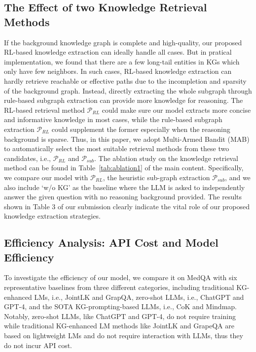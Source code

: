 \documentclass{article}
\theoremstyle{boldremark}
\begin{document}
\subsection{The Effect of two Knowledge Retrieval Methods}
If the background knowledge graph is complete and high-quality, our proposed RL-based knowledge extraction can ideally handle all cases. But in pratical implementation, we found that there are a few long-tail entities in KGs which only have few neighbors. In such cases, RL-based knowledge extraction can hardly retrieve reachable or effective paths due to the incompletion and sparsity of the background graph. Instead, directly extracting the whole subgraph through rule-based subgraph extraction can provide more knowledge for reasoning. The RL-based retrieval method $\mathcal{P}_{RL}$ could make sure our model extracts more concise and informative knowledge in most cases, while the rule-based subgraph extraction $\mathcal{P}_{RL}$ could supplement the former especially when the reasoning background is sparse. Thus, in this paper, we adopt Multi-Armed Bandit (MAB) to automatically select the most suitable retrieval methods from these two candidates, i.e., $\mathcal{P}_{RL}$ and $\mathcal{P}_{sub}$. The ablation study on the knowledge retrieval method can be found in Table~\ref{tab:ablation1} of the main content. Specifically, we compare our model with  $\mathcal{P}_{RL}$, the heuristic sub-graph extraction $\mathcal{P}_{sub}$, and we also include ‘w/o KG’ as the baseline where the LLM is asked to independently answer the given question with no reasoning background provided. The results shown in Table 3 of our submission clearly indicate the vital role of our proposed knowledge extraction strategies.


\subsection{Efficiency Analysis: API Cost and Model Efficiency }
To investigate the efficiency of our model, we compare it on MedQA with six representative baselines from three different categories, including traditional KG-enhanced LMs, i.e., JointLK and GrapQA, zero-shot LLMs, i.e., ChatGPT and GPT-4, and the SOTA KG-prompting-based LLMs, i.e., CoK and Mindmap. Notably, zero-shot LLMs, like ChatGPT and GPT-4, do not require training while traditional KG-enhanced LM methods like JointLK and GrapeQA are based on lightweight LMs and do not require interaction with LLMs, thus they do not incur API cost. 
\end{document}

